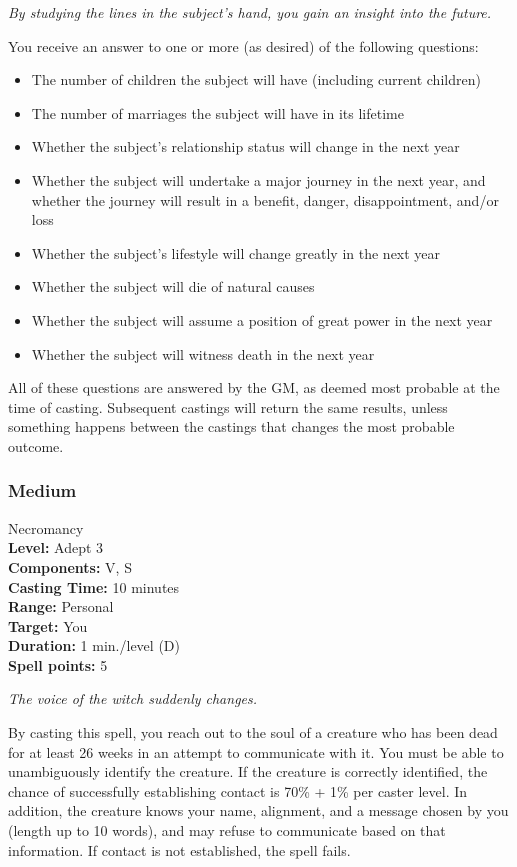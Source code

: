 \emph{By studying the lines in the subject's hand, you gain an insight into the future.}

You receive an answer to one or more (as desired) of the following questions:
\begin{itemize}
 \item The number of children the subject will have (including current children)
 \item The number of marriages the subject will have in its lifetime
 \item Whether the subject's relationship status will change in the next year
 \item Whether the subject will undertake a major journey in the next year, and whether the journey will result in a benefit, danger, disappointment, and/or loss
 \item Whether the subject's lifestyle will change greatly in the next year
 \item Whether the subject will die of natural causes
 \item Whether the subject will assume a position of great power in the next year
 \item Whether the subject will witness death in the next year
\end{itemize}
All of these questions are answered by the GM, as deemed most probable at the time of casting. Subsequent castings will return the same results, unless something happens between the castings that changes the most probable outcome.

\subsubsection{Medium}
\label{Spell:Medium}
Necromancy
\\ \textbf{Level:} Adept 3
\\ \textbf{Components:} V, S
\\ \textbf{Casting Time:} 10 minutes
\\ \textbf{Range:} Personal
\\ \textbf{Target:} You
\\ \textbf{Duration:} 1 min./level (D)
\\ \textbf{Spell points:} 5

\emph{The voice of the witch suddenly changes.}

By casting this spell, you reach out to the soul of a creature who has been dead for at least 26 weeks in an attempt to communicate with it.
You must be able to unambiguously identify the creature. If the creature is correctly identified, the chance of successfully establishing contact is 70\% + 1\% per caster level. In addition, the creature knows your name, alignment, and a message chosen by you (length up to 10 words), and may refuse to communicate based on that information. If contact is not established, the spell fails. 

